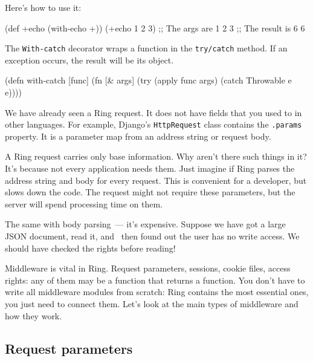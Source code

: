 Here's how to use it:

\begin{english}
\begin{clojure}
(def +echo (with-echo +))
(+echo 1 2 3)
;; The args are 1 2 3
;; The result is 6
6
\end{clojure}
\end{english}


The \verb|With-catch| decorator wraps a function in the \verb|try/catch| method. If an exception occurs, the result will be its object.

\begin{english}
\begin{clojure}
(defn with-catch [func]
(fn [& args]
(try
(apply func args)
(catch Throwable e
e))))
\end{clojure}
\end{english}


We have already seen a Ring request. It does not have fields that you used to in other languages. For example, Django's \verb|HttpRequest| class contains the \verb|.params| property. It is a parameter map from an address string or request body.

A Ring request carries only base information. Why aren't there such things in it? It's because not every application needs them. Just imagine if Ring parses the address string and body for every request. This is convenient for a developer, but slows down the code. The request might not require these parameters, but the server will spend processing time on them.

The same with body parsing~--- it's expensive. Suppose we have got a large JSON document, read it, and  then found out the user has no write access. We should have checked the rights before reading!

Middleware is vital in Ring. Request parameters, sessions, cookie files, access rights: any of them may be a function that returns a function. You don't have to write all middleware modules from scratch: Ring contains the most essential ones, you just need to connect them. Let's look at the main types of middleware and how they work.

\subsection{Request parameters}

